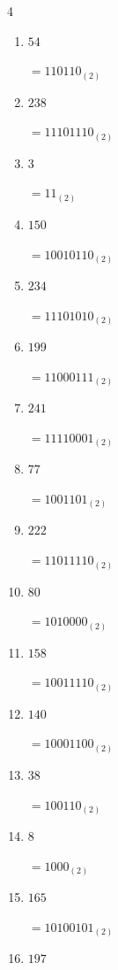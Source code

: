 \begin{multicols}{4}
\begin{enumerate}
        $=11001001_{(2)}$

  \item $54$

        $=110110_{(2)}$

  \item $238$

        $=11101110_{(2)}$

  \item $3$

        $=11_{(2)}$

  \item $150$

        $=10010110_{(2)}$

  \item $234$

        $=11101010_{(2)}$

  \item $199$

        $=11000111_{(2)}$

  \item $241$

        $=11110001_{(2)}$

  \item $77$

        $=1001101_{(2)}$

  \item $222$

        $=11011110_{(2)}$

  \item $80$

        $=1010000_{(2)}$

\columnbreak %

  \item $158$

        $=10011110_{(2)}$

  \item $140$

        $=10001100_{(2)}$

  \item $38$

        $=100110_{(2)}$

  \item $8$

        $=1000_{(2)}$

  \item $165$

        $=10100101_{(2)}$

  \item $197$


\end{enumerate}
\end{multicols}
